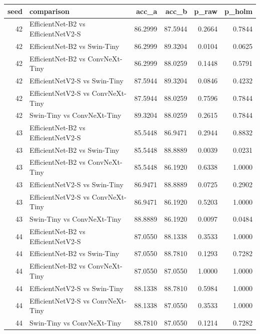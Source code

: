 \begin{tabular}{rlrrrr}
\toprule
seed & comparison & acc\_a & acc\_b & p\_raw & p\_holm \\
\midrule
42 & EfficientNet-B2 vs EfficientNetV2-S & 86.2999 & 87.5944 & 0.2664 & 0.7844 \\
42 & EfficientNet-B2 vs Swin-Tiny & 86.2999 & 89.3204 & 0.0104 & 0.0625 \\
42 & EfficientNet-B2 vs ConvNeXt-Tiny & 86.2999 & 88.0259 & 0.1448 & 0.5791 \\
42 & EfficientNetV2-S vs Swin-Tiny & 87.5944 & 89.3204 & 0.0846 & 0.4232 \\
42 & EfficientNetV2-S vs ConvNeXt-Tiny & 87.5944 & 88.0259 & 0.7596 & 0.7844 \\
42 & Swin-Tiny vs ConvNeXt-Tiny & 89.3204 & 88.0259 & 0.2615 & 0.7844 \\
43 & EfficientNet-B2 vs EfficientNetV2-S & 85.5448 & 86.9471 & 0.2944 & 0.8832 \\
43 & EfficientNet-B2 vs Swin-Tiny & 85.5448 & 88.8889 & 0.0039 & 0.0231 \\
43 & EfficientNet-B2 vs ConvNeXt-Tiny & 85.5448 & 86.1920 & 0.6338 & 1.0000 \\
43 & EfficientNetV2-S vs Swin-Tiny & 86.9471 & 88.8889 & 0.0725 & 0.2902 \\
43 & EfficientNetV2-S vs ConvNeXt-Tiny & 86.9471 & 86.1920 & 0.5203 & 1.0000 \\
43 & Swin-Tiny vs ConvNeXt-Tiny & 88.8889 & 86.1920 & 0.0097 & 0.0484 \\
44 & EfficientNet-B2 vs EfficientNetV2-S & 87.0550 & 88.1338 & 0.3533 & 1.0000 \\
44 & EfficientNet-B2 vs Swin-Tiny & 87.0550 & 88.7810 & 0.1293 & 0.7282 \\
44 & EfficientNet-B2 vs ConvNeXt-Tiny & 87.0550 & 87.0550 & 1.0000 & 1.0000 \\
44 & EfficientNetV2-S vs Swin-Tiny & 88.1338 & 88.7810 & 0.5984 & 1.0000 \\
44 & EfficientNetV2-S vs ConvNeXt-Tiny & 88.1338 & 87.0550 & 0.3533 & 1.0000 \\
44 & Swin-Tiny vs ConvNeXt-Tiny & 88.7810 & 87.0550 & 0.1214 & 0.7282 \\
\bottomrule
\end{tabular}
